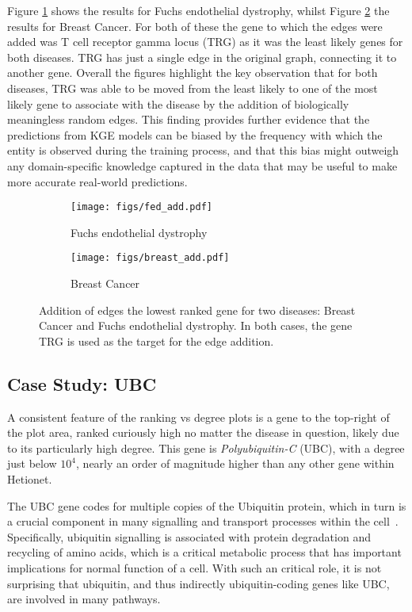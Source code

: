 Figure \ref{fig:add:fed} shows the results for Fuchs endothelial dystrophy, whilst Figure \ref{fig:add:breast} the results for Breast Cancer. For both of these the gene to which the edges were added was T cell receptor gamma locus (TRG) as it was the least likely genes for both diseases. TRG has just a single edge in the original graph, connecting it to another gene. Overall the figures highlight the key observation that for both diseases, TRG was able to be moved from the least likely to one of the most likely gene to associate with the disease by the addition of biologically meaningless random edges. This finding provides further evidence that the predictions from KGE models can be biased by the frequency with which the entity is observed during the training process, and that this bias might outweigh any domain-specific knowledge captured in the data that may be useful to make more accurate real-world predictions.

\begin{figure*}[!ht]
	\centering
	\begin{subfigure}[b]{0.48\textwidth}
		\centering
		\texttt{[image: figs/fed\_add.pdf]}
		\caption{Fuchs endothelial dystrophy}\label{fig:add:fed}
	\end{subfigure}
	\begin{subfigure}[b]{0.48\textwidth}
		\centering
		\texttt{[image: figs/breast\_add.pdf]}
		\caption{Breast Cancer}\label{fig:add:breast}
	\end{subfigure}
	\caption{Addition of edges the lowest ranked gene for two diseases: Breast Cancer and Fuchs endothelial dystrophy. In both cases, the gene TRG is used as the target for the edge addition.}
	\label{fig:add}
\end{figure*}

\subsection{Case Study: UBC}
\label{ssec:ubc}

A consistent feature of the ranking vs degree plots is a gene to the top-right of the plot area, ranked curiously high no matter the disease in question, likely due to its particularly high degree. This gene is \emph{Polyubiquitin-C} (UBC), with a degree just below \(10^4\), nearly an order of magnitude higher than any other gene within Hetionet.

The UBC gene codes for multiple copies of the Ubiquitin protein, which in turn is a crucial component in many signalling and transport processes within the cell~\cite{kimura2010ubi}. Specifically, ubiquitin signalling is associated with protein degradation and recycling of amino acids, which is a critical metabolic process that has important implications for normal function of a cell. With such an critical role, it is not surprising that ubiquitin, and thus indirectly ubiquitin-coding genes like UBC, are involved in many pathways.

